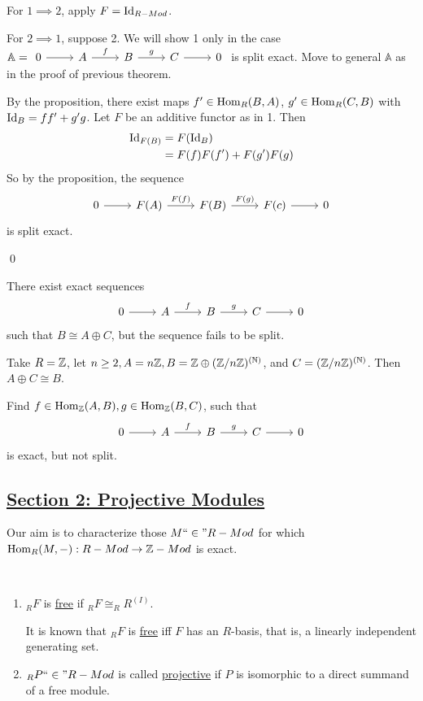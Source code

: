 \documentclass[x11names,reqno,14pt]{extarticle}
\newcommand{\A}{\mathbb{A}}
\newcommand{\fin}{``\in"}
\begin{document}
\proof

For $1\implies2$, apply $F = \operatorname{\mathrm{Id}}_{R-Mod}$. 

For $2\implies1$, suppose 2. We will show 1 only in the case $\A = \exactshort{A}{f}{B}{g}{C}$ is split exact. Move to general $\A$ as in the proof of previous theorem. 

By the proposition, there exist maps $f'\in{\mathrm{Hom}}_R(B, A)$, $g'\in{\mathrm{Hom}}_R(C, B)$ with $\operatorname{\mathrm{Id}}_B = ff' + g'g$. Let $F$ be an additive functor as in 1. Then
\begin{align*}
\operatorname{\mathrm{Id}}_{F(B)} & = F(\operatorname{\mathrm{Id}}_B) \\
			  & = F(f)F(f') + F(g')F(g) \\
\end{align*}
So by the proposition, the sequence
\[
\exactshort{F(A)}{F(f)}{F(B)}{F(g)}{F(c)}
\]
is split exact. 

\qed

\exm

There exist exact sequences 
\[
\exactshort{A}{f}{B}{g}{C}
\]
such that $B \cong A\oplus C$, but the sequence fails to be split.

Take $R = \mathbb{Z}$, let $n \geq 2, A = n\mathbb{Z}, B = \mathbb{Z}\oplus(\mathbb{Z}/n\mathbb{Z})^{(\mathbb{N})}$, and $C = (\mathbb{Z}/n\mathbb{Z})^{(\mathbb{N})}$. Then $A \oplus C \cong B$. 

Find $f \in {\mathrm{Hom}}_{\mathbb{Z}}(A, B), g \in {\mathrm{Hom}}_{\mathbb{Z}}(B, C)$, such that 
\[
\exactshort{A}{f}{B}{g}{C}
\]
is exact, but not split. 

\subsection*{\underline{Section 2: Projective Modules}}

Our aim is to characterize those $M\fin R-Mod$ for which ${\mathrm{Hom}}_R(M, -):R-Mod\to\mathbb{Z}-Mod$ is exact. 

\,

\begin{enumerate}

\item $_RF$ is \underline{free} if $_RF \cong _RR^{(I)}$. 

It is known that $_RF$ is \underline{free} iff $F$ has an $R$-basis, that is, a linearly independent generating set. 

\item $_RP \fin R-Mod$ is called \underline{projective} if $P$ is isomorphic to a direct summand of a free module. 

\end{enumerate}
\end{document}
